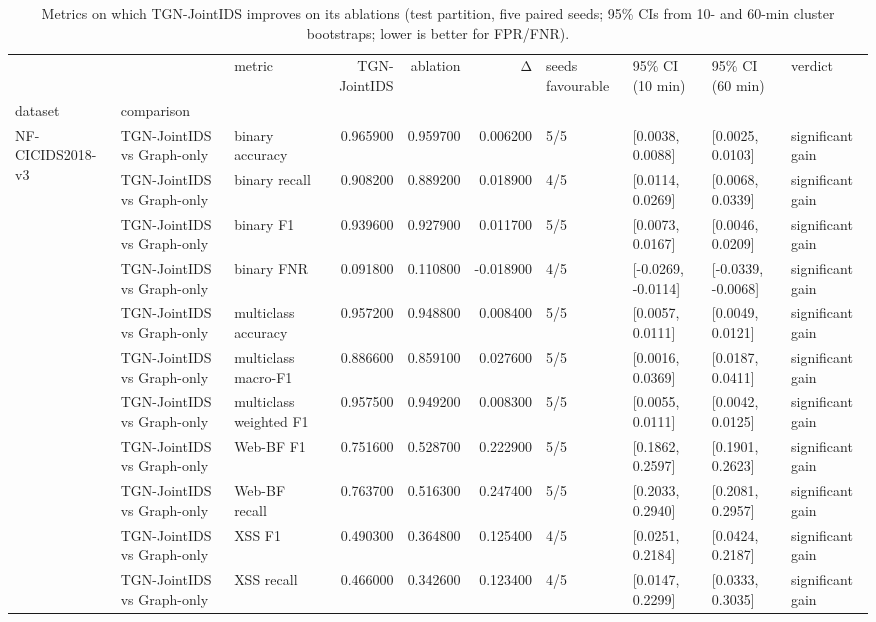 \begin{table}
\caption{Metrics on which TGN-JointIDS improves on its ablations (test partition, five paired seeds; 95\% CIs from 10- and 60-min cluster bootstraps; lower is better for FPR/FNR).}
\label{tab:ablation_statistics}
\begin{tabular}{lllrrrllll}
\toprule
 &  & metric & TGN-JointIDS & ablation & Δ & seeds favourable & 95\% CI (10 min) & 95\% CI (60 min) & verdict \\
dataset & comparison &  &  &  &  &  &  &  &  \\
\midrule
\multirow[t]{33}{*}{NF-CICIDS2018-v3} & TGN-JointIDS vs Graph-only & binary accuracy & 0.965900 & 0.959700 & 0.006200 & 5/5 & [0.0038, 0.0088] & [0.0025, 0.0103] & significant gain \\
 & TGN-JointIDS vs Graph-only & binary recall & 0.908200 & 0.889200 & 0.018900 & 4/5 & [0.0114, 0.0269] & [0.0068, 0.0339] & significant gain \\
 & TGN-JointIDS vs Graph-only & binary F1 & 0.939600 & 0.927900 & 0.011700 & 5/5 & [0.0073, 0.0167] & [0.0046, 0.0209] & significant gain \\
 & TGN-JointIDS vs Graph-only & binary FNR & 0.091800 & 0.110800 & -0.018900 & 4/5 & [-0.0269, -0.0114] & [-0.0339, -0.0068] & significant gain \\
 & TGN-JointIDS vs Graph-only & multiclass accuracy & 0.957200 & 0.948800 & 0.008400 & 5/5 & [0.0057, 0.0111] & [0.0049, 0.0121] & significant gain \\
 & TGN-JointIDS vs Graph-only & multiclass macro-F1 & 0.886600 & 0.859100 & 0.027600 & 5/5 & [0.0016, 0.0369] & [0.0187, 0.0411] & significant gain \\
 & TGN-JointIDS vs Graph-only & multiclass weighted F1 & 0.957500 & 0.949200 & 0.008300 & 5/5 & [0.0055, 0.0111] & [0.0042, 0.0125] & significant gain \\
 & TGN-JointIDS vs Graph-only & Web-BF F1 & 0.751600 & 0.528700 & 0.222900 & 5/5 & [0.1862, 0.2597] & [0.1901, 0.2623] & significant gain \\
 & TGN-JointIDS vs Graph-only & Web-BF recall & 0.763700 & 0.516300 & 0.247400 & 5/5 & [0.2033, 0.2940] & [0.2081, 0.2957] & significant gain \\
 & TGN-JointIDS vs Graph-only & XSS F1 & 0.490300 & 0.364800 & 0.125400 & 4/5 & [0.0251, 0.2184] & [0.0424, 0.2187] & significant gain \\
 & TGN-JointIDS vs Graph-only & XSS recall & 0.466000 & 0.342600 & 0.123400 & 4/5 & [0.0147, 0.2299] & [0.0333, 0.3035] & significant gain \\

\end{tabular}
\end{table}
